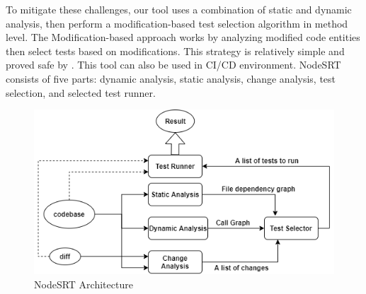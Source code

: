 \documentclass[10pt, conference]{IEEEtran}
\begin{document}
To mitigate these challenges, our tool uses a combination of static and dynamic analysis, then perform a modification-based test 
selection algorithm in method level. The Modification-based approach works by analyzing modified code entities 
then select tests based on modifications. This strategy is relatively simple and proved safe by \cite{b3, b4}. This tool can 
also be used in CI/CD environment. NodeSRT consists of five parts: dynamic analysis, static analysis, change analysis, 
test selection, and selected test runner. 
\begin{figure}[htbp]
    \centerline{\includegraphics[scale=0.45]{NodeSRT Architecture.png}}
    \caption{NodeSRT Architecture}
    \label{fig}
    \end{figure}    
\end{document}
